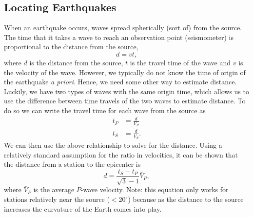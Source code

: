 \subsection{Locating Earthquakes}
When an earthquake occurs, waves spread spherically (sort of) from the source.
The time that it takes a wave to reach an observation point (seismometer) is
proportional to the distance from the source,
\begin{equation}
    d = v t,
\end{equation}
where $d$ is the distance from the source, $t$ is the travel time of the wave
and $v$ is the velocity of the wave.  However, we typically do not know the time
of origin of the earthquake {\it a priori}.  Hence, we need some other way to
estimate distance.  Luckily, we have two types of waves with the same origin
time, which allows us to use the difference between time travels of the two
waves to estimate distance.  To do so we can write the travel time for each wave
from the source as
\begin{align}
    t_P &= \frac{d}{V_P} \\
    t_S &= \frac{d}{V_S}.
\end{align}
We can then use the above relationship to solve for the distance.
Using a relatively standard assumption for the ratio in velocities, it
can be shown that the distance from a station to the epicenter is
\begin{equation}
    d = \frac{t_S - t_P}{\sqrt{3} - 1} \bar{V}_P ,
\end{equation}
where $\bar{V}_P$ is the average $P$-wave velocity.  Note: this equation only
works for stations relatively near the source ($<$20$^\circ$) because as the
distance to the source increases the curvature of the Earth comes into play.
\FloatBarrier


